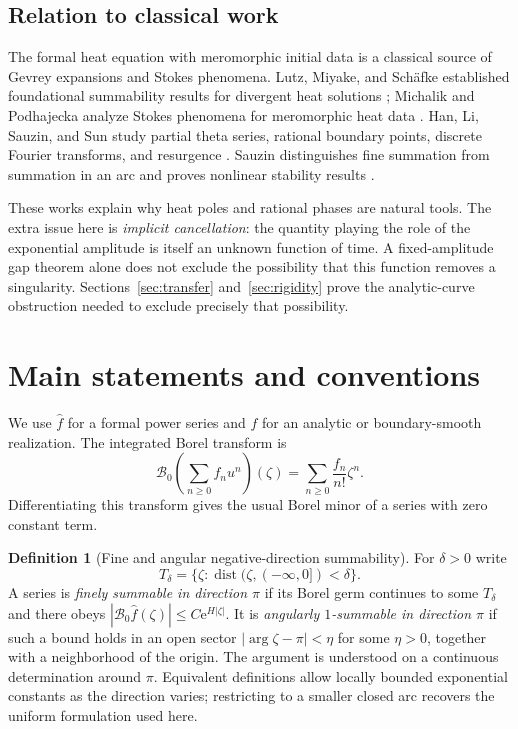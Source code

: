 \documentclass[11pt,a4paper]{article}
\numberwithin{equation}{section}
\theoremstyle{definition}
\newtheorem{definition}[theorem]{Definition}
\theoremstyle{remark}
\newcommand{\ee}{\mathrm e}
\newcommand{\dist}{\operatorname{dist}}
\newcommand{\B}{\mathcal B_0}
\begin{document}
\subsection{Relation to classical work}
The formal heat equation with meromorphic initial data is a classical
source of Gevrey expansions and Stokes phenomena.  Lutz, Miyake, and
Sch\"afke established foundational summability results for divergent heat
solutions \cite{lms}; Michalik and Podhajecka analyze Stokes phenomena for
meromorphic heat data \cite{mp}.  Han, Li, Sauzin, and Sun study partial
theta series, rational boundary points, discrete Fourier transforms, and
resurgence \cite{hlss}.  Sauzin distinguishes fine summation from summation
in an arc and proves nonlinear stability results \cite{sauzin}.

These works explain why heat poles and rational phases are natural tools.
The extra issue here is \emph{implicit cancellation}: the quantity playing
the role of the exponential amplitude is itself an unknown function of
time.  A fixed-amplitude gap theorem alone does not exclude the possibility
that this function removes a singularity.  Sections~\ref{sec:transfer}
and~\ref{sec:rigidity} prove the analytic-curve obstruction needed to
exclude precisely that possibility.

\section{Main statements and conventions}
\label{sec:main}

We use $\widehat f$ for a formal power series and $f$ for an analytic or
boundary-smooth realization.  The integrated Borel transform is
\begin{equation}
 \B\!\left(\sum_{n\ge0} f_n u^n\right)(\zeta)
       =\sum_{n\ge0}\frac{f_n}{n!}\zeta^n.
 \label{eq:borel-convention}
\end{equation}
Differentiating this transform gives the usual Borel minor of a series
with zero constant term.

\begin{definition}[Fine and angular negative-direction summability]
For $\delta>0$ write
\[
 T_\delta=\{\zeta:\dist(\zeta,(-\infty,0])<\delta\}.
\]
A series is \emph{finely summable in direction $\pi$} if its Borel germ
continues to some $T_\delta$ and there obeys
$|\B\widehat f(\zeta)|\le C\ee^{H|\zeta|}$.
It is \emph{angularly $1$-summable in direction $\pi$} if such a bound
holds in an open sector
$|\arg\zeta-\pi|<\eta$ for some $\eta>0$, together with a neighborhood
of the origin.  The argument is understood on a continuous determination
around $\pi$.  Equivalent definitions allow locally bounded exponential
constants as the direction varies; restricting to a smaller closed arc
recovers the uniform formulation used here.
\end{definition}
\end{document}
